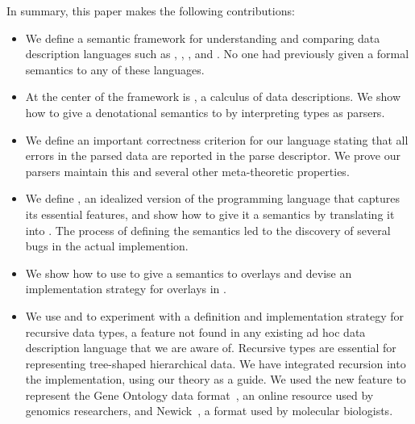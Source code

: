 In summary, this paper makes the following contributions:
%
\begin{itemize}
\item We define a semantic framework for understanding and comparing data description languages such as \pads{},
\packettypes{}, \datascript{}, and \blt{}.
No one had previously given a formal semantics to any of these 
languages.

\item At the center of the framework is \ddc{},
a calculus of data descriptions.
We show how to give a denotational semantics
to \ddc{} by interpreting
types as parsers. 

\item We define an important correctness criterion for our language
stating that all errors in the parsed data are reported in the parse 
descriptor.  We prove our \ddc{} parsers maintain this and several
other meta-theoretic properties.

\item We define \ipads{}, an idealized
version of the \pads{} programming language
that captures its essential features,
and show how to give it a semantics by translating it into \ddc{}.  
The process of defining the semantics led to the
discovery of several bugs in the actual implemention.

\item We show how to use \ddc{} to give a semantics to
 overlays and devise an implementation strategy
for overlays in \pads{}.

\item We use \ipads{} and \ddc{} to experiment with 
a definition and implementation strategy for recursive data types,
a feature not found in any existing ad hoc data description language that
we are aware of.  Recursive types are essential for representing tree-shaped hierarchical
data.  We have integrated recursion into the \pads{} implementation,
using our theory as a guide. We used the new feature to represent
the Gene Ontology data 
format~\cite{geneontology}, an online resource used by genomics researchers,
and Newick~\cite{newick}, a format used by molecular biologists.
\end{itemize}